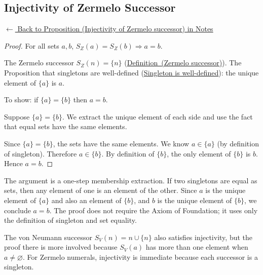 
\subsection*{Injectivity of Zermelo Successor}
\label{prf:zermelo-successor-injective}

\begin{remark*}[Return]
\hyperref[prop:zermelo-successor-injective]{$\leftarrow$ Back to Proposition (Injectivity of Zermelo successor) in Notes}
\end{remark*}

\begin{proof}
\Claim For all sets $a, b$, $S_Z(a) = S_Z(b) \Rightarrow a = b$.

\Given The Zermelo successor $S_Z(n) = \{n\}$
(\hyperref[def:zermelo-successor]{Definition~(Zermelo successor)}). The
Proposition that singletons are well-defined
(\hyperref[prop:singleton-well-defined]{Singleton is well-defined}): the unique
element of $\{a\}$ is $a$.

\Goal To show: if $\{a\} = \{b\}$ then $a = b$.

\Strategy Suppose $\{a\} = \{b\}$. We extract the unique element of each side
and use the fact that equal sets have the same elements.

Since $\{a\} = \{b\}$, the sets have the same elements. We know $a \in \{a\}$
(by definition of singleton). Therefore $a \in \{b\}$. By definition of $\{b\}$,
the only element of $\{b\}$ is $b$. Hence $a = b$. \AsReq
\end{proof}

\begin{remark*}
The argument is a one-step membership extraction. If two singletons are equal as
sets, then any element of one is an element of the other. Since $a$ is the
unique element of $\{a\}$ and also an element of $\{b\}$, and $b$ is the unique
element of $\{b\}$, we conclude $a = b$. The proof does not require the Axiom
of Foundation; it uses only the definition of singleton and set equality.
\end{remark*}

\begin{remark*}
The von Neumann successor $S_V(n) = n \cup \{n\}$ also satisfies injectivity,
but the proof there is more involved because $S_V(a)$ has more than one element
when $a \neq \varnothing$. For Zermelo numerals, injectivity is immediate
because each successor is a singleton.
\end{remark*}

